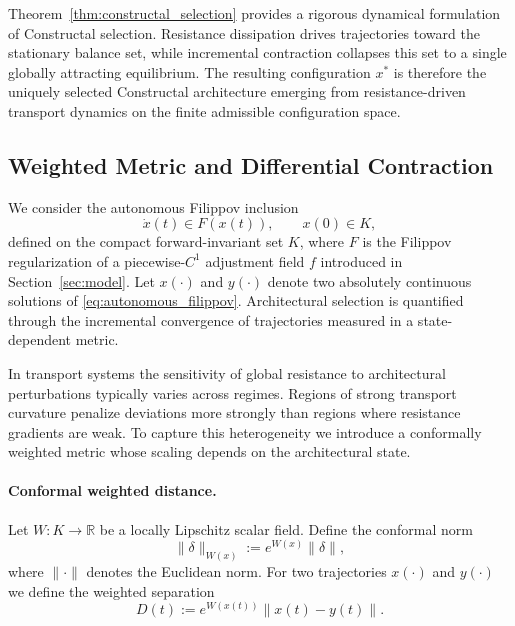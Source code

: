 \documentclass[12pt]{article}
\theoremstyle{plain}
\theoremstyle{definition}
\theoremstyle{remark}
\begin{document}
Theorem~\ref{thm:constructal_selection}
provides a rigorous dynamical formulation of Constructal selection.
Resistance dissipation drives trajectories toward the stationary
balance set, while incremental contraction collapses this set to a
single globally attracting equilibrium.
The resulting configuration $x^\ast$ is therefore the uniquely selected
Constructal architecture emerging from resistance-driven transport
dynamics on the finite admissible configuration space.


\subsection{Weighted Metric and Differential Contraction}
\label{subsec:contraction_framework}

We consider the autonomous Filippov inclusion
\begin{equation}
\dot x(t)\in F(x(t)),
\qquad x(0)\in K,
\label{eq:autonomous_filippov}
\end{equation}
defined on the compact forward-invariant set $K$, where $F$ is the
Filippov regularization of a piecewise-$C^1$ adjustment field
$f$ introduced in Section~\ref{sec:model}.
Let $x(\cdot)$ and $y(\cdot)$ denote two absolutely continuous
solutions of \eqref{eq:autonomous_filippov}.
Architectural selection is quantified through the incremental
convergence of trajectories measured in a state-dependent metric.

In transport systems the sensitivity of global resistance to
architectural perturbations typically varies across regimes.
Regions of strong transport curvature penalize deviations more
strongly than regions where resistance gradients are weak.
To capture this heterogeneity we introduce a conformally
weighted metric whose scaling depends on the architectural
state.

\paragraph{Conformal weighted distance.}

Let $W:K\to\mathbb R$ be a locally Lipschitz scalar field.
Define the conformal norm
\begin{equation}
\|\delta\|_{W(x)}
:=
e^{W(x)}\|\delta\|,
\label{eq:conformal_norm}
\end{equation}
where $\|\cdot\|$ denotes the Euclidean norm.
For two trajectories $x(\cdot)$ and $y(\cdot)$ we define the
weighted separation
\begin{equation}
D(t)
:=
e^{W(x(t))}\|x(t)-y(t)\|.
\label{eq:weighted_distance}
\end{equation}
\end{document}
